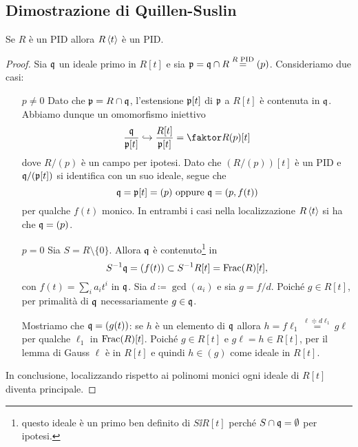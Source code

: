 \subsection{Dimostrazione di Quillen-Suslin}
\begin{lemma}[]\label{PIDImplicaLocalizzazioneAMoniciPID}
Se $R$ \`e un PID allora $R\ps t$ \`e un PID.
\end{lemma}
\begin{proof}
Sia $\qf$ un ideale primo in $R[t]$ e sia $\pf=\qf\cap R\pasgnl={$R$ PID}(p)$. Consideriamo due casi:
\setlength{\leftmargini}{0cm}
\begin{itemize}
\item[$\boxed{p\neq 0}$] Dato che $\pf=R\cap \qf$, l'estensione $\pf[t]$ di $\pf$ a $R[t]$ è contenuta in $\qf$. Abbiamo dunque un omomorfismo iniettivo
\[\frac\qf{\pf[t]}\inj \frac{R[t]}{\pf[t]}=\quot R{(p)}[t]\]
dove $R/(p)$ \`e un campo per ipotesi.
Dato che $(R/(p))[t]$ \`e un PID e $\qf/(\pf[t])$ si identifica con un suo ideale, segue che 
\[\qf=\pf[t]=(p)\text{ oppure }\qf=(p,f(t))\] 
per qualche $f(t)$ monico. In entrambi i casi nella localizzazione $R\ps t$ si ha che $\qf=(p)$. 
\item[$\boxed{p=0}$] Sia $S=R\setminus \{0\}$. Allora $\qf$ è contenuto\footnote{questo ideale \`e un primo ben definito di $S\ii R[t]$ perch\'e $S\cap \qf=\emptyset$ per ipotesi.} in 
\[S^{-1}\qf=(f(t))\subset S^{-1}R[t]=\Frac(R)[t],\] 
con $f(t)=\sum_i a_it^i$ in $\qf$. Sia $d\coloneqq\gcd(a_i)$ e sia $g=f/d$. Poich\'e $g\in R[t]$, per primalit\`a di $\qf$ necessariamente $g\in \qf$.

Mostriamo che $\qf=(g(t))$: se $h$ è un elemento di $\qf$ allora $h=f\ell_1\overset{\ell\doteqdot d\ell_1}=g\ell$ per qualche $\ell_1$ in $\Frac(R)[t]$. Poich\'e $g\in R[t]$ e $g\ell=h\in R[t]$, per il lemma di Gauss $\ell$ è in $R[t]$ e quindi $h\in (g)$ come ideale in $R[t]$. 
\end{itemize}
\setlength{\leftmargini}{0.5cm}
In conclusione, localizzando rispetto ai polinomi monici ogni ideale di $R[t]$ diventa principale.
\end{proof}

